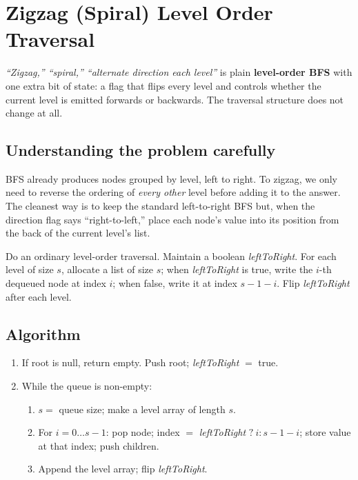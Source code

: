 \section{Zigzag (Spiral) Level Order Traversal}
\label{sec:trees-zigzag}


\begin{patternbox}
\emph{``Zigzag,'' ``spiral,'' ``alternate direction each level''} is plain
\textbf{level-order BFS} with one extra bit of state: a flag that flips
every level and controls whether the current level is emitted forwards or
backwards. The traversal structure does not change at all.
\end{patternbox}

\subsection*{Understanding the problem carefully}

BFS already produces nodes grouped by level, left to right. To zigzag, we
only need to reverse the ordering of \emph{every other} level before
adding it to the answer. The cleanest way is to keep the standard
left-to-right BFS but, when the direction flag says ``right-to-left,''
place each node's value into its position from the back of the current
level's list.

\begin{ideabox}
Do an ordinary level-order traversal. Maintain a boolean
\textit{leftToRight}. For each level of size $s$, allocate a list of size
$s$; when \textit{leftToRight} is true, write the $i$-th dequeued node at
index $i$; when false, write it at index $s-1-i$. Flip
\textit{leftToRight} after each level.
\end{ideabox}

\subsection*{Algorithm}

\begin{enumerate}
  \item If root is null, return empty. Push root; \textit{leftToRight} $=$
        true.
  \item While the queue is non-empty:
  \begin{enumerate}
    \item $s=$ queue size; make a level array of length $s$.
    \item For $i=0\ldots s-1$: pop node; index $=$ \textit{leftToRight}
          $?\ i : s-1-i$; store value at that index; push children.
    \item Append the level array; flip \textit{leftToRight}.
  \end{enumerate}
\end{enumerate}

